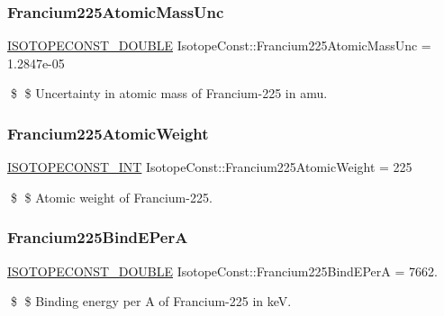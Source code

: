 \subsubsection{\texorpdfstring{Francium225\+Atomic\+Mass\+Unc}{Francium225AtomicMassUnc}}
{\footnotesize\ttfamily \mbox{\hyperlink{group___isotope_const-_macros_ga8f45a7272ce02c0b4c65c44636ed719a}{I\+S\+O\+T\+O\+P\+E\+C\+O\+N\+S\+T\+\_\+\+D\+O\+U\+B\+LE}} Isotope\+Const\+::\+Francium225\+Atomic\+Mass\+Unc = 1.\+2847e-\/05}

\$ \$ Uncertainty in atomic mass of Francium-\/225 in amu. \mbox{\label{group___isotope_const-_francium-_fr225_ga13e6422259365f0a430d87f1fa4403ca}} 
\subsubsection{\texorpdfstring{Francium225\+Atomic\+Weight}{Francium225AtomicWeight}}
{\footnotesize\ttfamily \mbox{\hyperlink{group___isotope_const-_macros_ga5f18360b3e99483a35c32d789e62621c}{I\+S\+O\+T\+O\+P\+E\+C\+O\+N\+S\+T\+\_\+\+I\+NT}} Isotope\+Const\+::\+Francium225\+Atomic\+Weight = 225}

\$ \$ Atomic weight of Francium-\/225. \mbox{\label{group___isotope_const-_francium-_fr225_ga70ce7114cdd05ceb183482e325bef62a}} 
\subsubsection{\texorpdfstring{Francium225\+Bind\+E\+PerA}{Francium225BindEPerA}}
{\footnotesize\ttfamily \mbox{\hyperlink{group___isotope_const-_macros_ga8f45a7272ce02c0b4c65c44636ed719a}{I\+S\+O\+T\+O\+P\+E\+C\+O\+N\+S\+T\+\_\+\+D\+O\+U\+B\+LE}} Isotope\+Const\+::\+Francium225\+Bind\+E\+PerA = 7662.}

\$ \$ Binding energy per A of Francium-\/225 in keV. \mbox{\label{group___isotope_const-_francium-_fr225_ga6f851219319627bac088917757a0afe9}} 
